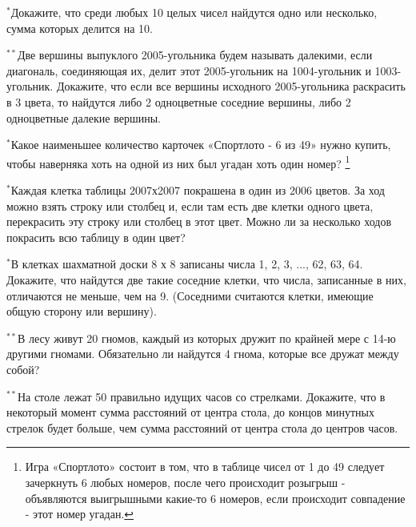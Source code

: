 \begin{thm}
	$^{\ast}$Докажите, что среди любых 10 целых чисел найдутся одно или несколько, сумма которых делится на 10.
\end{thm}

\begin{thm}
	$^{\ast\ast}$Две вершины выпуклого 2005-угольника будем называть далекими, если диагональ, соединяющая их, делит этот 2005-угольник на 1004-угольник и 1003-угольник. Докажите, что если все вершины исходного 2005-угольника раскрасить в 3 цвета, то найдутся либо 2 одноцветные соседние вершины, либо 2 одноцветные далекие вершины.
\end{thm}

\begin{thm}
	$^{\ast}$Какое наименьшее количество карточек «Спортлото - 6 из 49» нужно купить, чтобы наверняка хоть на одной из них был угадан хоть один номер? \footnote{Игра «Спортлото» состоит в том, что в таблице чисел от 1 до 49 следует зачеркнуть 6 любых номеров, после чего происходит розыгрыш - объявляются выигрышными какие-то 6 номеров, если происходит совпадение - этот номер угадан.}
\end{thm}

\begin{thm}
	$^{\ast}$Каждая клетка таблицы 2007х2007 покрашена в один из 2006 цветов. За ход можно взять строку или столбец и, если там есть две клетки одного цвета, перекрасить эту строку или столбец в этот цвет. Можно ли за несколько ходов покрасить всю таблицу в один цвет?
\end{thm}

\begin{thm}
	$^{\ast}$В клетках шахматной доски 8 х 8 записаны числа 1, 2, 3, ..., 62, 63, 64. Докажите, что найдутся две такие соседние клетки, что числа, записанные в них, отличаются не меньше, чем на 9. (Соседними считаются клетки, имеющие общую сторону или вершину).
\end{thm}

\begin{thm}
	$^{\ast\ast}$В лесу живут 20 гномов, каждый из которых дружит по крайней мере с 14-ю другими гномами. Обязательно ли найдутся 4 гнома, которые все дружат между собой?
\end{thm}

\begin{thm}
	$^{\ast\ast}$На столе лежат 50 правильно идущих часов со стрелками. Докажите, что в некоторый момент сумма расстояний от центра стола, до концов минутных стрелок будет больше, чем сумма расстояний от центра стола до центров часов.
\end{thm}

